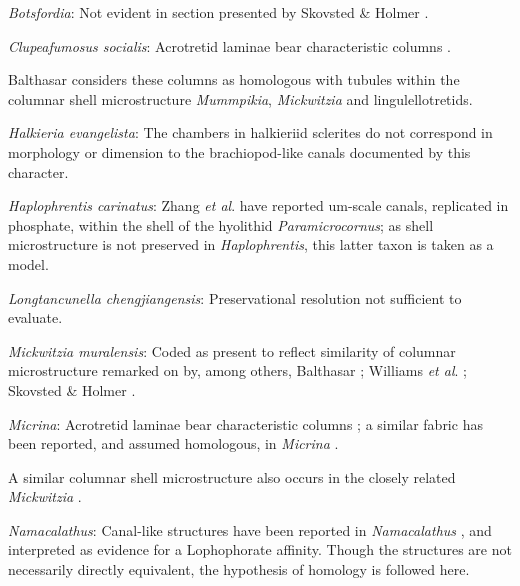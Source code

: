 \documentclass[openany]{book}
\theoremstyle{definition}
\theoremstyle{definition}
\theoremstyle{definition}
\theoremstyle{remark}
\begin{document}
\hypertarget{Botsfordia-coding-131}{}
\emph{Botsfordia}: Not evident in section presented by Skovsted \&
Holmer \citeyearpar{Skovsted2003EarlyCambrian}.

\hypertarget{Clupeafumosus_socialis-coding-131}{}
\emph{Clupeafumosus socialis}: Acrotretid laminae bear characteristic
columns \citep[e.g.][]{Zhang2016Epithelialcell}.

Balthasar \citeyearpar{Balthasar2008iMummpikia} considers these columns
as homologous with tubules within the columnar shell microstructure
\emph{Mummpikia}, \emph{Mickwitzia} and lingulellotretids.

\hypertarget{Halkieria_evangelista-coding-131}{}
\emph{Halkieria evangelista}: The chambers in halkieriid sclerites do
not correspond in morphology or dimension to the brachiopod-like canals
documented by this character.

\hypertarget{Haplophrentis_carinatus-coding-131}{}
\emph{Haplophrentis carinatus}: Zhang \emph{et al}.
\citeyearpar{Zhang2018Ahyolithid} have reported um-scale canals,
replicated in phosphate, within the shell of the hyolithid
\emph{Paramicrocornus}; as shell microstructure is not preserved in
\emph{Haplophrentis}, this latter taxon is taken as a model.

\hypertarget{Longtancunella_chengjiangensis-coding-131}{}
\emph{Longtancunella chengjiangensis}: Preservational resolution not
sufficient to evaluate.

\hypertarget{Mickwitzia_muralensis-coding-131}{}
\emph{Mickwitzia muralensis}: Coded as present to reflect similarity of
columnar microstructure remarked on by, among others, Balthasar
\citeyearpar{Balthasar2008iMummpikia}; Williams \emph{et al}.
\citeyearpar{Williams2007Supplement}; Skovsted \& Holmer
\citeyearpar{Skovsted2003EarlyCambrian}.

\hypertarget{Micrina-coding-131}{}
\emph{Micrina}: Acrotretid laminae bear characteristic columns
\citep[e.g.][]{Zhang2016Epithelialcell}; a similar fabric has been
reported, and assumed homologous, in \emph{Micrina}
\citep{Butler2012ConstructingCambrian}.

A similar columnar shell microstructure also occurs in the closely
related \emph{Mickwitzia} \citep{Balthasar2008iMummpikia}.

\hypertarget{Namacalathus-coding-131}{}
\emph{Namacalathus}: Canal-like structures have been reported in
\emph{Namacalathus} \citep{Zhuravlev2015Ediacaranskeletal}, and
interpreted as evidence for a Lophophorate affinity. Though the
structures are not necessarily directly equivalent, the hypothesis of
homology is followed here.
\end{document}

